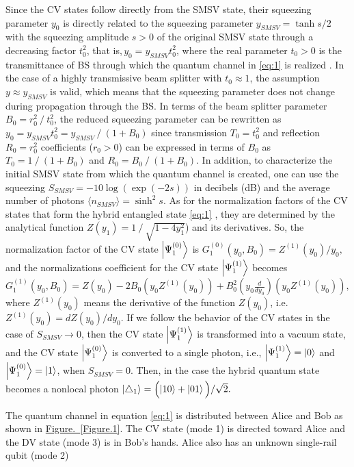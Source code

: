 \documentclass{optica-article}
\begin{document}
Since the CV states follow directly from the SMSV state, their squeezing parameter $y_0$ is directly related to the squeezing parameter $y_{SMSV}=\tanh s /2$
with the squeezing amplitude $s>0$ of the original SMSV state through a decreasing factor $t_0^2$, that is,\,$y_0=y_{SMSV} t_0^2$, where the real parameter $t_0>0$ is the transmittance of BS through which the quantum channel in \eqref{eq:1} is realized \cite{34,35}. 
In the case of a highly transmissive beam splitter with $t_0\approx1$, the assumption $y\approx y_{SMSV}$ is valid, which means that the squeezing parameter does not change during propagation through the BS. In terms of the beam splitter parameter $B_0=r_0^2⁄t_0^2$, the reduced squeezing parameter can be rewritten as $y_0=y_{SMSV}t_0^2=y_{SMSV}⁄(1+B_0)$ since transmission $T_0=t_0^2$ and reflection $R_0=r_0^2$ coefficients ($r_0>0$) can be expressed in terms of $B_0$ as $T_0=1⁄(1+B_0)$ and $R_0=B_0⁄(1+B_0)$.
In addition, to characterize the initial SMSV state from which the quantum channel is created, one can use the squeezing $S_{SMSV}=-10 \log(\exp(-2s))$ in decibels (dB) and the average number of photons $\langle n_{SMSV} \rangle = \sinh^2 s$. As for the normalization factors of the CV states that form the hybrid entangled state \eqref{eq:1} , they are determined by the analytical function $Z(y_1)=1⁄\sqrt{1-4y_1^2 }$) and its derivatives. So, the normalization factor of the CV state $\ket{\Psi_{1}^{(0)}}$ is 
$G_1^{(0)}(y_0,B_0) = Z^{(1)}(y_0)/y_0,$ and the normalizations coefficient for the CV state 
$\ket{\Psi_{1}^{(1)}}$ becomes 
$G_1^{(1)}(y_0,B_0) = Z(y_0) - 2B_0(y_0Z^{(1)}(y_0)) + B_0^2(y_0\frac{d}{dy_0})(y_0Z^{(1)}(y_0)),$
where $Z^{(1)}(y_0)$ means the derivative of the function $Z(y_0)$, i.e. $Z^{(1)}(y_0) = dZ(y_0)/dy_0$. If we follow the behavior of the CV states in the case of $S_{SMSV}\rightarrow0$, then the CV state $\ket{\Psi_{1}^{(1)}}$ is transformed into a vacuum state, and the CV state $\ket{\Psi_{1}^{(0)}}$ is converted to a single photon, i.e., $\ket{\Psi_{1}^{(1)}} = \ket{0}$ and
$\ket{\Psi_{1}^{(0)}} = \ket{1}$, when $S_{SMSV} = 0$. Then, in the case the hybrid quantum state becomes a nonlocal photon $\ket{\triangle_{1}} =
    \Bigl(
    \ket{10} +
    \ket{01}\Bigl)/\sqrt{2}.$


The quantum channel in equation \eqref{eq:1}  is distributed between Alice and Bob as shown in \hyperref[Figure.2]{Figure.~\ref*{Figure.1}}. The CV state (mode 1) is directed toward Alice and the DV state (mode 3) is in Bob's hands. Alice also has an unknown single-rail qubit (mode 2) 
\end{document}
